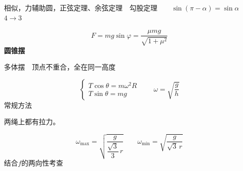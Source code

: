 相似，力辅助圆，正弦定理、余弦定理　勾股定理　　$\sin(\pi-\alpha)=\sin\alpha$
$4\to3$


\[
F=mg\sin\varphi=\frac{\mu mg}{\sqrt{1+\mu^2}}
\]
\textbf{圆锥摆}


多体摆　顶点不重合，全在同一高度

\[
\left\{\begin{array}{l}
T\cos\theta=m\omega^2R\\
T\sin\theta=mg
\end{array}\right.
\qquad
\omega=\sqrt{\frac{g}{h}}
\]
常规方法

两绳上都有拉力。


\[
\omega_{\max}=\sqrt{\dfrac{g}{\dfrac{\sqrt3}{3}\,r}}
\qquad
\omega_{\min}=\sqrt{\dfrac{g}{\sqrt3\,r}}
\]
结合$f$的两向性考查
